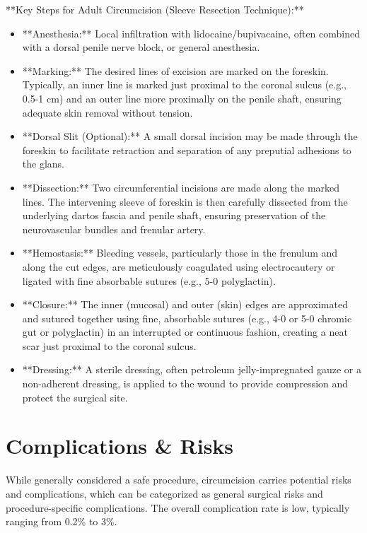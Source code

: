 **Key Steps for Adult Circumcision (Sleeve Resection Technique):**
\begin{itemize}
  \item **Anesthesia:** Local infiltration with lidocaine/bupivacaine, often combined with a dorsal penile nerve block, or general anesthesia.
  \item **Marking:** The desired lines of excision are marked on the foreskin. Typically, an inner line is marked just proximal to the coronal sulcus (e.g., 0.5-1 cm) and an outer line more proximally on the penile shaft, ensuring adequate skin removal without tension.
  \item **Dorsal Slit (Optional):** A small dorsal incision may be made through the foreskin to facilitate retraction and separation of any preputial adhesions to the glans.
  \item **Dissection:** Two circumferential incisions are made along the marked lines. The intervening sleeve of foreskin is then carefully dissected from the underlying dartos fascia and penile shaft, ensuring preservation of the neurovascular bundles and frenular artery.
  \item **Hemostasis:** Bleeding vessels, particularly those in the frenulum and along the cut edges, are meticulously coagulated using electrocautery or ligated with fine absorbable sutures (e.g., 5-0 polyglactin).
  \item **Closure:** The inner (mucosal) and outer (skin) edges are approximated and sutured together using fine, absorbable sutures (e.g., 4-0 or 5-0 chromic gut or polyglactin) in an interrupted or continuous fashion, creating a neat scar just proximal to the coronal sulcus.
  \item **Dressing:** A sterile dressing, often petroleum jelly-impregnated gauze or a non-adherent dressing, is applied to the wound to provide compression and protect the surgical site.
\end{itemize}

\section*{Complications \& Risks}
While generally considered a safe procedure, circumcision carries potential risks and complications, which can be categorized as general surgical risks and procedure-specific complications. The overall complication rate is low, typically ranging from 0.2\% to 3\%.

